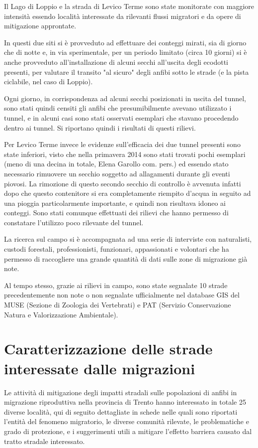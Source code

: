 \documentclass[11pt,a4paper,twoside]{memoir}
\begin{document}
Il Lago di Loppio e la strada di Levico Terme sono state monitorate con maggiore intensità essendo località interessate da rilevanti flussi migratori e da opere di mitigazione approntate.

In questi due siti si è provveduto ad effettuare dei conteggi mirati, sia di giorno che di notte e, in via sperimentale, per un periodo limitato (circa 10 giorni) si è anche provveduto all'installazione di alcuni secchi all'uscita degli ecodotti presenti, per valutare il transito "al sicuro" degli anfibi sotto le strade (e la pista ciclabile, nel caso di Loppio).

Ogni giorno, in corrispondenza ad alcuni secchi posizionati in uscita del tunnel, sono stati quindi censiti gli anfibi che presumibilmente avevano utilizzato i tunnel, e in alcuni casi sono stati osservati esemplari che stavano procedendo dentro ai tunnel. Si riportano quindi i risultati di questi rilievi.

     Per Levico Terme invece le evidenze sull'efficacia dei due tunnel presenti sono state inferiori, visto che nella primavera 2014 sono stati trovati pochi esemplari (meno di una decina in totale, Elena Garollo com. pers.) ed essendo stato necessario rimuovere un secchio soggetto ad allagamenti durante gli eventi piovosi. La rimozione di questo secondo secchio di controllo è avvenuta infatti dopo che questo contenitore si era completamente riempito d'acqua in seguito ad una pioggia particolarmente importante, e quindi non risultava idoneo ai conteggi. Sono stati comunque effettuati dei rilievi che hanno permesso di constatare l'utilizzo poco rilevante del tunnel.

La ricerca sul campo si è accompagnata ad una serie di interviste con naturalisti, custodi forestali, professionisti, funzionari, appassionati e volontari che ha permesso di raccogliere una grande quantità di dati sulle zone di migrazione già note.

Al tempo stesso, grazie ai rilievi in campo, sono state segnalate 10 strade precedentemente non note o non segnalate ufficialmente nel database GIS del MUSE (Sezione di Zoologia dei Vertebrati) e PAT (Servizio Conservazione Natura e Valorizzazione Ambientale).

\section{Caratterizzazione delle strade interessate dalle migrazioni}
\label{subsubsec:statoanal_fenomig_sintesi_strade}
Le attività di mitigazione degli impatti stradali sulle popolazioni di anfibi in migrazione riproduttiva nella provincia di Trento hanno interessato in totale 25 diverse località, qui di seguito dettagliate in schede nelle quali sono riportati l’entità del fenomeno migratorio, le diverse comunità rilevate, le problematiche e grado di protezione, e i suggerimenti utili a mitigare l’effetto barriera causato dal tratto stradale interessato.
\end{document}

